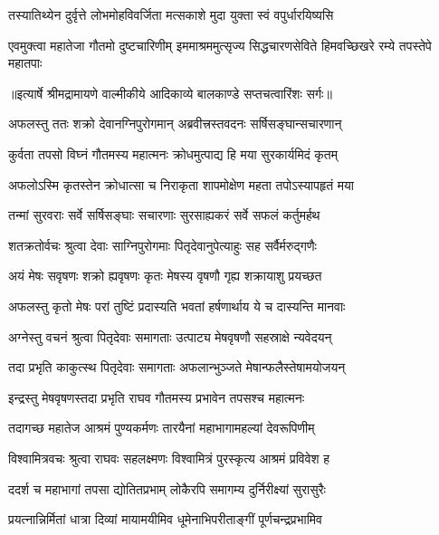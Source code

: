 \twolineshloka
{तस्यातिथ्येन दुर्वृत्ते लोभमोहविवर्जिता}
{मत्सकाशे मुदा युक्ता स्वं वपुर्धारयिष्यसि} %

\threelineshloka
{एवमुक्त्वा महातेजा गौतमो दुष्टचारिणीम्}
{इममाश्रममुत्सृज्य सिद्धचारणसेविते}
{हिमवच्छिखरे रम्ये तपस्तेपे महातपाः} %


{॥इत्यार्षे श्रीमद्रामायणे वाल्मीकीये आदिकाव्ये बालकाण्डे सप्तचत्वारिंशः सर्गः॥}


\twolineshloka
{अफलस्तु ततः शक्रो देवानग्निपुरोगमान्}
{अब्रवीत्त्रस्तवदनः सर्षिसङ्घान्सचारणान्} %

\twolineshloka
{कुर्वता तपसो विघ्नं गौतमस्य महात्मनः}
{क्रोधमुत्पाद्य हि मया सुरकार्यमिदं कृतम्} %

\twolineshloka
{अफलोऽस्मि कृतस्तेन क्रोधात्सा च निराकृता}
{शापमोक्षेण महता तपोऽस्यापहृतं मया} %

\twolineshloka
{तन्मां सुरवराः सर्वे सर्षिसङ्घाः सचारणाः}
{सुरसाह्यकरं सर्वे सफलं कर्तुमर्हथ} %

\twolineshloka
{शतक्रतोर्वचः श्रुत्वा देवाः साग्निपुरोगमाः}
{पितृदेवानुपेत्याहुः सह सर्वैर्मरुद्गणैः} %

\twolineshloka
{अयं मेषः सवृषणः शक्रो ह्यवृषणः कृतः}
{मेषस्य वृषणौ गृह्य शक्रायाशु प्रयच्छत} %

\twolineshloka
{अफलस्तु कृतो मेषः परां तुष्टिं प्रदास्यति}
{भवतां हर्षणार्थाय ये च दास्यन्ति मानवाः} %

\twolineshloka
{अग्नेस्तु वचनं श्रुत्वा पितृदेवाः समागताः}
{उत्पाट्य मेषवृषणौ सहस्राक्षे न्यवेदयन्} %

\twolineshloka
{तदा प्रभृति काकुत्स्थ पितृदेवाः समागताः}
{अफलान्भुञ्जते मेषान्फलैस्तेषामयोजयन्} %

\twolineshloka
{इन्द्रस्तु मेषवृषणस्तदा प्रभृति राघव}
{गौतमस्य प्रभावेन तपसश्च महात्मनः} %

\twolineshloka
{तदागच्छ महातेज आश्रमं पुण्यकर्मणः}
{तारयैनां महाभागामहल्यां देवरूपिणीम्} %

\twolineshloka
{विश्वामित्रवचः श्रुत्वा राघवः सहलक्ष्मणः}
{विश्वामित्रं पुरस्कृत्य आश्रमं प्रविवेश ह} %

\twolineshloka
{ददर्श च महाभागां तपसा द्योतितप्रभाम्}
{लोकैरपि समागम्य दुर्निरीक्ष्यां सुरासुरैः} %

\twolineshloka
{प्रयत्नान्निर्मितां धात्रा दिव्यां मायामयीमिव}
{धूमेनाभिपरीताङ्गीं पूर्णचन्द्रप्रभामिव} %

